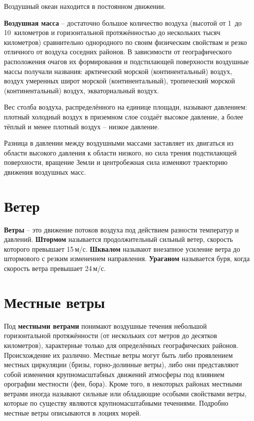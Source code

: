 \documentclass[a4paper, 12pt, twoside, final, book, russian, fittopage, cyremdash, openright]{ncc}
\newcommand{\mps}{\,м/с\xspace}
\begin{document}
Воздушный океан находится в постоянном движении.

\textbf{Воздушная масса} \--- достаточно
большое количество воздуха (высотой от 1~до 10~километров и
горизонтальной протяжённостью до нескольких тысяч километров)
сравнительно однородного по своим физическим свойствам и резко
отличного от воздуха соседних районов. В зависимости от
географического расположения очагов их формирования и подстилающей
поверхности воздушные массы получали названия: арктический морской
(континентальный) воздух, воздух умеренных широт морской
(континентальный), тропический морской (континентальный) воздух,
экваториальный воздух.

Вес столба воздуха, распределённого на единице площади, называют
давлением: плотный холодный воздух в приземном слое
создаёт высокое давление, а более тёплый и менее плотный воздух \---
низкое давление.

Разница в давлении между воздушными массами заставляет их двигаться из
области высокого давления к области низкого, но сила трения
подстилающей поверхности, вращение Земли и центробежная сила изменяют
траекторию движения воздушных масс.

\section{Ветер}
\label{sec:wind}

\textbf{Ветры} \--- это движение потоков воздуха под
действием разности температур и
давлений. \textbf{Штормом} называется продолжительный
сильный ветер, скорость которого превышает 15\mps{}.
\textbf{Шквалом} называют внезапное усиление ветра до
штормового с резким изменением направления.
\textbf{Ураганом} называется буря, когда скорость ветра
превышает 24\mps{}.

\section{Местные ветры}
\label{sec:local_winds}

Под \textbf{местными ветрами} понимают воздушные течения небольшой
горизонтальной протяжённости (от нескольких сот метров до десятков
километров), характерные только для определённых географических
районов. Происхождение их различно. Местные ветры могут быть либо
проявлением местных циркуляции (бризы, горно-долинные
ветры), либо они представляют собой
изменения крупномасштабных движений атмосферы под влиянием орографии
местности (фен, бора). Кроме того, в некоторых
районах местными ветрами иногда называют сильные или обладающие
особыми свойствами ветры, которые по существу являются
крупномасштабными течениями. Подробно местные ветры описываются в
лоциях морей.
\end{document}
